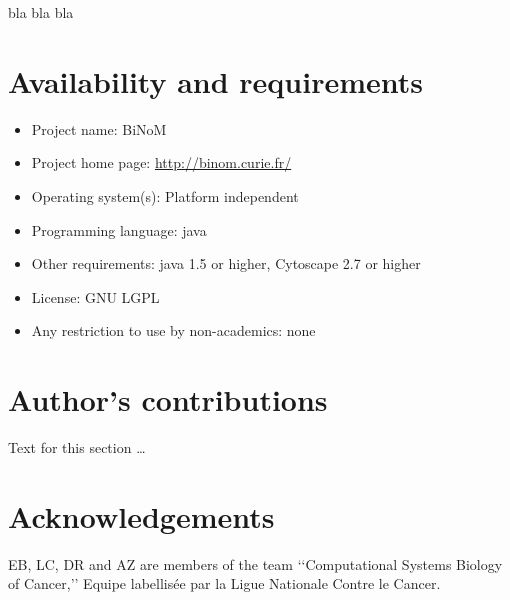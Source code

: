 \documentclass[10pt]{bmc_article}
\newenvironment{bmcformat}{\baselineskip20pt\sloppy\setboolean{publ}{false}}{\baselineskip20pt\sloppy}
\begin{document}
\begin{bmcformat}
bla bla bla

\section*{Availability and requirements}

\begin{itemize}
\item Project name: BiNoM
\item Project home page: \url{http://binom.curie.fr/}
\item Operating system(s): Platform independent
\item Programming language: java
\item Other requirements: java 1.5 or higher, Cytoscape 2.7 or higher
\item License: GNU LGPL
\item Any restriction to use by non-academics: none
\end{itemize}





\bigskip

\section*{Author's contributions}
    Text for this section \ldots

    

\section*{Acknowledgements}
  EB, LC, DR and AZ are members of the team ‘‘Computational Systems Biology of
Cancer,’’ Equipe labellisée par la Ligue Nationale Contre le Cancer.
 

\end{bmcformat}
\end{document}
